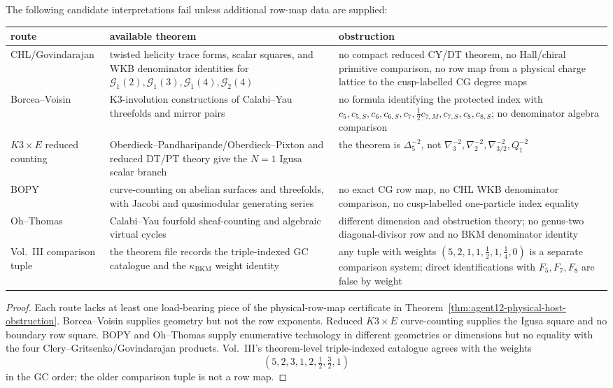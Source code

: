 \begin{proposition}
\label{prop:agent12-candidate-host-attack}
The following candidate interpretations fail unless additional row-map
data are supplied:
\begin{center}
\small
\begin{tabular}{p{}|p{}|p{}}
route&available theorem&obstruction\\ \hline
CHL/Govindarajan&
twisted helicity trace forms, scalar squares, and WKB denominator
identities for \(\mathcal G_1(2),\mathcal G_1(3),\mathcal G_1(4),
\mathcal G_2(4)\)&
no compact reduced CY/DT theorem, no Hall/chiral primitive comparison,
no row map from a physical charge lattice to the cusp-labelled CG degree
maps\\
Borcea--Voisin&
K3-involution constructions of Calabi--Yau threefolds and mirror pairs
\cite{BORCEA,VOISIN}&
no formula identifying the protected index with
\(c_5,c_{5,S},c_6,c_{6,S},c_7,\frac12c_{7,M},c_{7,S},c_8,c_{8,S}\);
no denominator algebra comparison\\
\(K3\times E\) reduced counting&
Oberdieck--Pandharipande/Oberdieck--Pixton and reduced DT/PT theory give
the \(N=1\) Igusa scalar branch \cite{OPand,OB,OberdieckReducedPT}&
the theorem is \(\Delta_5^{-2}\), not
\(\nabla_3^{-2},\nabla_2^{-2},\nabla_{3/2}^{-2},Q_1^{-2}\)\\
BOPY&
curve-counting on abelian surfaces and threefolds, with Jacobi and
quasimodular generating series \cite{BOPY}&
no exact CG row map, no CHL WKB denominator comparison, no
cusp-labelled one-particle index equality\\
Oh--Thomas&
Calabi--Yau fourfold sheaf-counting and algebraic virtual cycles
\cite{OhThomasI,OhThomasII}&
different dimension and obstruction theory; no genus-two
diagonal-divisor row and no BKM denominator identity\\
Vol.~III comparison tuple&
the theorem file records the triple-indexed GC catalogue and the
\(\kappa_{\mathrm{BKM}}\) weight identity&
any tuple with weights \((5,2,1,1,\frac12,1,\frac14,0)\) is a separate
comparison system; direct identifications with \(F_5,F_7,F_8\) are false
by weight
\end{tabular}
\end{center}
\end{proposition}

\begin{proof}
Each route lacks at least one load-bearing piece of the physical-row-map
certificate in Theorem~\ref{thm:agent12-physical-host-obstruction}.
Borcea--Voisin supplies geometry but not the row exponents.  Reduced
\(K3\times E\) curve-counting supplies the Igusa square and no boundary
row square.  BOPY and Oh--Thomas supply enumerative technology in
different geometries or dimensions but no equality with the four
Clery--Gritsenko/Govindarajan products.  Vol.~III's theorem-level
triple-indexed catalogue agrees with the weights
\[
(5,2,3,1,2,\tfrac12,\tfrac32,1)
\]
in the GC order; the older comparison tuple is not a row map.
\end{proof}

